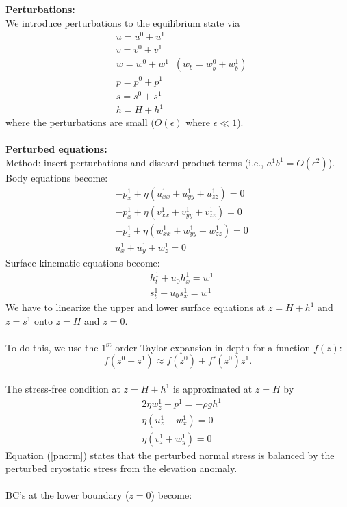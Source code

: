 \documentclass[paper=a4, fontsize=11pt]{article}
\begin{document}
\noindent\textbf{Perturbations:}\\
We introduce perturbations to the equilibrium state via
\begin{align}
&u= u^0 +  u^1 \\
&v= v^0 +  v^1 \\
&w =  w^0 + w^1 \;\; (w_b=w_b^0 + w_b^1)\\
&p = p^0 +  p^1\\
&s =  s^0 + s^1 \\
&h = H +  h^1
\end{align}
where the perturbations are small ($O(\epsilon)$ where $\epsilon \ll 1$). \\ \\
\noindent\textbf{Perturbed equations:}\\
Method: insert perturbations and discard product terms (i.e., $a^1b^1=O(\epsilon^2)$).\\
Body equations become:
\begin{align}
&-p_x^1 + \eta (u_{xx}^1 +u_{yy}^1+ u_{zz}^1) = 0 \\
&-p_x^1 + \eta (v_{xx}^1 +v_{yy}^1+ v_{zz}^1) = 0 \\
&-p_z^1 + \eta (w_{xx}^1 +w_{yy}^1+ w_{zz}^1) = 0\\
&u_x^1 + u_y^1 + w_z^1 = 0
\end{align}
Surface kinematic equations become:
\begin{align}
&h_t^1 + u_0 h_x^1  = w^1 \label{ht} \\
&s_t^1  + u_0 s_x^1 = w^1 \label{st}
\end{align}
We have to linearize the upper and lower surface equations at $z=H +  h^1$
and $z= s^1$ onto $z=H$ and $z=0$.
\\ \\
To do this, we
use the $1^\mathrm{st}$-order Taylor expansion in depth for a function $f(z)$:
$$ f(z^0 + z^1) \approx f(z^0) + f'(z^0)z^1. $$
\\
The stress-free condition at $z=H+h^1$ is approximated at $z=H$ by
\begin{align}
&2\eta w_z^1 - p^1 = -\rho g h^1 \label{pnorm} \\
&\eta(u_z^1 +w_x^1) = 0 \\
&\eta(v_z^1 +w_y^1) = 0
\end{align}
Equation (\ref{pnorm}) states that the perturbed normal stress is balanced
by the perturbed cryostatic stress from the elevation anomaly.
\\ \\
BC's at the lower boundary ($z=0$) become:
\end{document}
